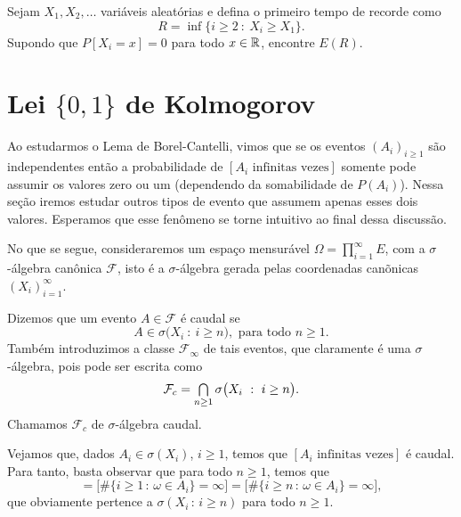 \begin{exercise}
  Sejam $X_1, X_2, \dots$ variáveis aleatórias \iid e defina o primeiro tempo de recorde como
  \begin{equation}
    R = \inf\{i \geq 2 \ : \  X_i \geq X_1\}.
  \end{equation}
  Supondo que $P[X_i=x]=0$ para todo $x\in{\ensuremath{\mathbb R}}$, encontre $E(R)$.
\end{exercise}


\section{Lei \texorpdfstring{$\{0, 1\}$}{\{0,1\}} de Kolmogorov}

Ao estudarmos o Lema de Borel-Cantelli, vimos que se os eventos $(A_i)_{i \geq 1}$ são independentes então a probabilidade de $[A_i \text{ infinitas vezes}]$ somente pode assumir os valores zero ou um (dependendo da somabilidade de $P(A_i)$).
Nessa seção iremos estudar outros tipos de evento que assumem apenas esses dois valores.
Esperamos que esse fenômeno se torne intuitivo ao final dessa discussão.

No que se segue, consideraremos um espaço mensurável $\Omega = \prod_{i=1}^\infty E$, com a $\sigma$-álgebra canônica $\mathcal{F}$,
isto é a $\sigma$-álgebra gerada pelas coordenadas canõnicas $(X_i)_{i=1}^\infty$.
\begin{definition}
  Dizemos que um evento $A \in \mathcal{F}$ é caudal se
  \begin{equation}
    A \in \sigma\big( X_i \ : \ i \geq n\big), \text{ para todo $n \geq 1$}.
  \end{equation}
  Também introduzimos a classe $\mathcal{F}_\infty$ de tais eventos, que claramente é uma $\sigma$-álgebra, pois pode ser escrita como
  \begin{equation}
    \mathcal{F}_c = \operatorname*{{\textstyle \bigcap}}_{n \geq 1} \sigma\big( X_i \ : \ i \geq n\big).
  \end{equation}
  Chamamos $\mathcal{F}_c$ de $\sigma$-álgebra caudal. 
\end{definition}

Vejamos que, dados $A_i \in \sigma(X_i)$, $i \geq 1$, temos que $[A_i \text{ infinitas vezes}]$ é caudal.
Para tanto, basta observar que para todo $n \geq 1$, temos que
\begin{equation*}
  [A_i \text{ infinitas vezes}] = \big[\#\{i \geq 1 \, : \, \omega \in A_i\} = \infty\big] = \big[\#\{i \geq n \, : \, \omega \in A_i\} = \infty\big],
\end{equation*}
que obviamente pertence a $\sigma(X_i\, : \, i \geq n)$ para todo $n \geq 1$.

